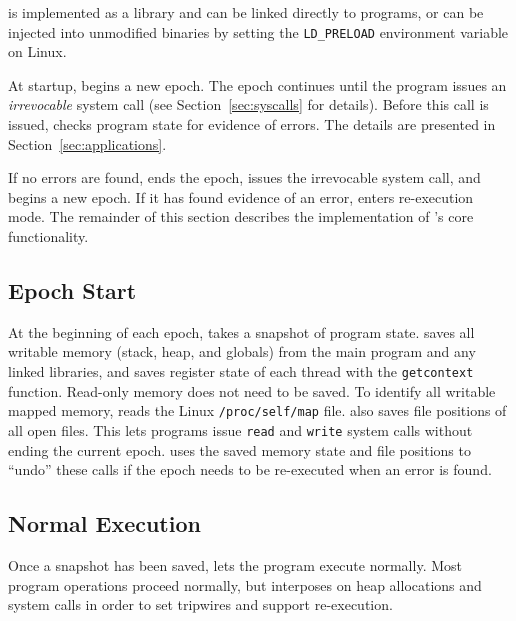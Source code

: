 \label{sec:implementation}

\doubletake{} is implemented as a library and can be linked directly to programs, or can be injected into unmodified binaries by setting the \texttt{LD\_PRELOAD} environment variable on Linux.

At startup, \doubletake{} begins a new epoch. The epoch continues until the program issues an \emph{irrevocable} system call (see Section~\ref{sec:syscalls} for details). Before this call is issued, \doubletake{} checks program state for evidence of errors. The details are presented in Section~\ref{sec:applications}.

If no errors are found, \doubletake{} ends the epoch, issues the irrevocable system call, and begins a new epoch. If it has found evidence of an error, \doubletake{} enters re-execution mode. The remainder of this section describes the implementation of \doubletake{}'s core functionality.

\subsection{Epoch Start}
\label{sec:implementation/start}

At the beginning of each epoch, \doubletake{} takes a snapshot of program state. \doubletake{} saves all writable memory (stack, heap, and globals) from the main program and any linked libraries, and saves register state of each thread with the \texttt{getcontext} function. Read-only memory does not need to be saved. To identify all writable mapped memory, \doubletake{} reads the Linux \texttt{/proc/self/map} file. \doubletake{} also saves file positions of all open files. This lets programs issue \texttt{read} and \texttt{write} system calls without ending the current epoch. \doubletake{} uses the saved memory state and file positions to ``undo'' these calls if the epoch needs to be re-executed when an error is found.


\subsection{Normal Execution}
\label{sec:implementation/normalexecution}

Once a snapshot has been saved, \doubletake{} lets the program execute normally. Most program operations proceed normally, but \doubletake{} interposes on heap allocations and system calls in order to set tripwires and support re-execution.

